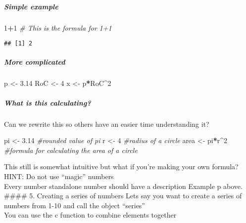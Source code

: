 \documentclass[]{article}
\newenvironment{Shaded}{\begin{snugshade}}{\end{snugshade}}
\newcommand{\DecValTok}[1]{\textcolor[rgb]{0.00,0.00,0.81}{#1}}
\newcommand{\FloatTok}[1]{\textcolor[rgb]{0.00,0.00,0.81}{#1}}
\newcommand{\StringTok}[1]{\textcolor[rgb]{0.31,0.60,0.02}{#1}}
\newcommand{\CommentTok}[1]{\textcolor[rgb]{0.56,0.35,0.01}{\textit{#1}}}
\newcommand{\OperatorTok}[1]{\textcolor[rgb]{0.81,0.36,0.00}{\textbf{#1}}}
\newcommand{\NormalTok}[1]{#1}
\let\oldsubparagraph\subparagraph
\renewcommand{\subparagraph}[1]{\oldsubparagraph{#1}\mbox{}}
\begin{document}
\subparagraph{Simple example}\label{simple-example}

\begin{Shaded}
\begin{Highlighting}[]
\DecValTok{1}\OperatorTok{+}\DecValTok{1} \CommentTok{# This is the formula for 1+1}
\end{Highlighting}
\end{Shaded}

\begin{verbatim}
## [1] 2
\end{verbatim}

\subparagraph{More complicated}\label{more-complicated}

\begin{Shaded}
\begin{Highlighting}[]
\NormalTok{p <-}\StringTok{ }\FloatTok{3.14}
\NormalTok{RoC <-}\StringTok{ }\DecValTok{4}
\NormalTok{x <-}\StringTok{ }\NormalTok{p}\OperatorTok{*}\NormalTok{RoC}\OperatorTok{^}\DecValTok{2}
\end{Highlighting}
\end{Shaded}

\subparagraph{What is this calculating?}\label{what-is-this-calculating}

Can we rewrite this so others have an easier time understanding it?\\

\begin{Shaded}
\begin{Highlighting}[]
\NormalTok{pi <-}\StringTok{ }\FloatTok{3.14} \CommentTok{#rounded value of pi}
\NormalTok{r <-}\StringTok{ }\DecValTok{4} \CommentTok{#radius of a circle}
\NormalTok{area <-}\StringTok{ }\NormalTok{pi}\OperatorTok{*}\NormalTok{r}\OperatorTok{^}\DecValTok{2} \CommentTok{#formula for calculating the area of a circle}
\end{Highlighting}
\end{Shaded}

This still is somewhat intuitive but what if you're making your own
formula?\\
HINT: Do not use ``magic'' numbers\\
Every number standalone number should have a description Example p
above.\\
\#\#\#\# 5. Creating a series of numbers Lets say you want to create a
series of numbers from 1-10 and call the object ``series''\\
You can use the c function to combine elements together\\
\end{document}
